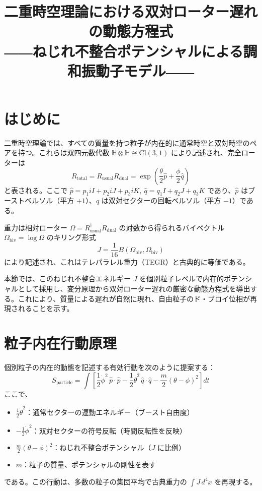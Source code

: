 \documentclass[dvipdfmx,a4paper]{article}
\title{二重時空理論における双対ローター遅れの動態方程式\\
――ねじれ不整合ポテンシャルによる調和振動子モデル――}
\author{}
\date{}
\begin{document}
\maketitle

\section{はじめに}

二重時空理論では、すべての質量を持つ粒子が内在的に通常時空と双対時空のペアを持つ。これらは双四元数代数 $\mathbb{H}\otimes\mathbb{H}\cong\mathrm{Cl}(3,1)$ により記述され、完全ローターは
\begin{equation}
R_{\text{total}} = R_{\text{usual}} R_{\text{dual}}
= \exp \left(\frac{\theta}{2} \hat{p} + \frac{\phi}{2}\hat{q}\right)
\end{equation}
と表される。ここで $\hat{p} = p_1 iI + p_2 iJ + p_3 iK, ~ \hat{q} = q_1 I + q_2 J + q_3 K$ であり、$\hat{p}$ はブーストベルソル（平方 $+1$）、$\hat{q}$ は双対セクターの回転ベルソル（平方 $-1$）である。

重力は相対ローター $\Omega = R_{\text{usual}}^\dagger R_{\text{dual}}$ の対数から得られるバイベクトル $\Omega_{\text{biv}}=\log\Omega$ のキリング形式
\begin{equation}
J = \frac{1}{16} B(\Omega_{\text{biv}},\Omega_{\text{biv}})
\end{equation}
により記述され、これはテレパラレル重力（TEGR）と古典的に等価である。

本節では、このねじれ不整合エネルギー $J$ を個別粒子レベルで内在的ポテンシャルとして採用し、変分原理から双対ローター遅れの厳密な動態方程式を導出する。これにより、質量による遅れが自然に現れ、自由粒子のド・ブロイ位相が再現されることを示す。

\section{粒子内在行動原理}

個別粒子の内在的動態を記述する有効行動を次のように提案する：
\begin{equation}
S_{\text{particle}} = \int \left[ 
\frac{1}{2} \dot{\phi}^2 \, \hat{p}\cdot\hat{p}
- \frac{1}{2} \dot{\theta}^2 \, \hat{q}\cdot\hat{q}
- \frac{m}{2} (\theta - \phi)^2 
\right] dt
\end{equation}
ここで、
\begin{itemize}
\item $\frac{1}{2}\dot{\theta}^2$：通常セクターの運動エネルギー（ブースト自由度）
\item $-\frac{1}{2}\dot{\phi}^2$：双対セクターの符号反転（時間反転性を反映）
\item $\frac{m}{2}(\theta - \phi)^2$：ねじれ不整合ポテンシャル（$J$ に比例）
\item $m$：粒子の質量、ポテンシャルの剛性を表す
\end{itemize}
である。この行動は、多数の粒子の集団平均で古典重力の $\int J\,d^4x$ を再現する。
\end{document}
